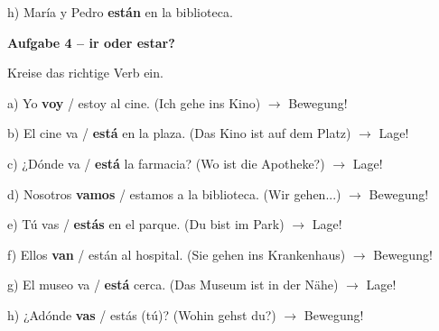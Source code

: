 \documentclass[11pt, a4paper]{article}
\newcommand{\fachfarbe}{spanisch}
\newcommand{\punktebox}[1]{\hfill\fbox{\small \_\_\_/#1}}
\newcommand{\lsg}[1]{\textcolor{loesung}{\textbf{#1}}}
\newenvironment{aufgabe}[1]{%
    \needspace{5\baselineskip}%
    \nopagebreak[4]%
    \vspace{10pt}
    \noindent\textbf{\textcolor{\fachfarbe}{Aufgabe #1}}
    \nopagebreak[4]%
    \vspace{5pt}
    \nopagebreak[4]%
    \begin{list}{}{\leftmargin=0pt}
    \item[]
}{%
    \end{list}
}
\begin{document}
\vspace{0.8em}

\noindent
h) María y Pedro \lsg{están} en la biblioteca.

\vspace{15pt}


\begin{aufgabe}{4 -- ir oder estar?}
Kreise das richtige Verb ein. \punktebox{8}
\end{aufgabe}

\noindent
a) Yo \lsg{voy} / estoy al cine. (Ich gehe ins Kino) \textcolor{loesung}{$\rightarrow$ Bewegung!}

\vspace{0.8em}

\noindent
b) El cine va / \lsg{está} en la plaza. (Das Kino ist auf dem Platz) \textcolor{loesung}{$\rightarrow$ Lage!}

\vspace{0.8em}

\noindent
c) ¿Dónde va / \lsg{está} la farmacia? (Wo ist die Apotheke?) \textcolor{loesung}{$\rightarrow$ Lage!}

\vspace{0.8em}

\noindent
d) Nosotros \lsg{vamos} / estamos a la biblioteca. (Wir gehen...) \textcolor{loesung}{$\rightarrow$ Bewegung!}

\vspace{0.8em}

\noindent
e) Tú vas / \lsg{estás} en el parque. (Du bist im Park) \textcolor{loesung}{$\rightarrow$ Lage!}

\vspace{0.8em}

\noindent
f) Ellos \lsg{van} / están al hospital. (Sie gehen ins Krankenhaus) \textcolor{loesung}{$\rightarrow$ Bewegung!}

\vspace{0.8em}

\noindent
g) El museo va / \lsg{está} cerca. (Das Museum ist in der Nähe) \textcolor{loesung}{$\rightarrow$ Lage!}

\vspace{0.8em}

\noindent
h) ¿Adónde \lsg{vas} / estás (tú)? (Wohin gehst du?) \textcolor{loesung}{$\rightarrow$ Bewegung!}
\end{document}
